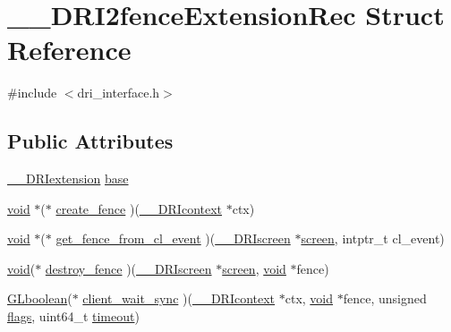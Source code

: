 \hypertarget{struct_____d_r_i2fence_extension_rec}{}\section{\+\_\+\+\_\+\+D\+R\+I2fence\+Extension\+Rec Struct Reference}
\label{struct_____d_r_i2fence_extension_rec}


{\ttfamily \#include $<$dri\+\_\+interface.\+h$>$}

\subsection*{Public Attributes}
\begin{DoxyCompactItemize}
\item 
\hyperlink{dri__interface_8h_a4e0a61c8ece00d2b2c6792a9a1b55385}{\+\_\+\+\_\+\+D\+R\+Iextension} \hyperlink{struct_____d_r_i2fence_extension_rec_a887144d176907da6cc6f255baa6b142c}{base}
\item 
\hyperlink{_s_d_l__opengles2__gl2ext_8h_ae5d8fa23ad07c48bb609509eae494c95}{void} $\ast$($\ast$ \hyperlink{struct_____d_r_i2fence_extension_rec_ad75a0042594520674e333b2105f72e91}{create\+\_\+fence} )(\hyperlink{dri__interface_8h_a3fd295cba82b5a3d79f1ee7e12bfb908}{\+\_\+\+\_\+\+D\+R\+Icontext} $\ast$ctx)
\item 
\hyperlink{_s_d_l__opengles2__gl2ext_8h_ae5d8fa23ad07c48bb609509eae494c95}{void} $\ast$($\ast$ \hyperlink{struct_____d_r_i2fence_extension_rec_aab159b47cdc19dbd3e3e05e1e2a8b783}{get\+\_\+fence\+\_\+from\+\_\+cl\+\_\+event} )(\hyperlink{dri__interface_8h_a9961b01d421ee1fd6ed3c05acc9ca561}{\+\_\+\+\_\+\+D\+R\+Iscreen} $\ast$\hyperlink{cad_8h_ae04e09e4e3831bfc1632c509ae37dcec}{screen}, intptr\+\_\+t cl\+\_\+event)
\item 
\hyperlink{_s_d_l__opengles2__gl2ext_8h_ae5d8fa23ad07c48bb609509eae494c95}{void}($\ast$ \hyperlink{struct_____d_r_i2fence_extension_rec_a482020bd8edb9b4d4851d3ac40336da6}{destroy\+\_\+fence} )(\hyperlink{dri__interface_8h_a9961b01d421ee1fd6ed3c05acc9ca561}{\+\_\+\+\_\+\+D\+R\+Iscreen} $\ast$\hyperlink{cad_8h_ae04e09e4e3831bfc1632c509ae37dcec}{screen}, \hyperlink{_s_d_l__opengles2__gl2ext_8h_ae5d8fa23ad07c48bb609509eae494c95}{void} $\ast$fence)
\item 
\hyperlink{gl_8h_aea1419aa8aec5854bd9807b45171029d}{G\+Lboolean}($\ast$ \hyperlink{struct_____d_r_i2fence_extension_rec_ab8888221e5e53dc147dae85578148cca}{client\+\_\+wait\+\_\+sync} )(\hyperlink{dri__interface_8h_a3fd295cba82b5a3d79f1ee7e12bfb908}{\+\_\+\+\_\+\+D\+R\+Icontext} $\ast$ctx, \hyperlink{_s_d_l__opengles2__gl2ext_8h_ae5d8fa23ad07c48bb609509eae494c95}{void} $\ast$fence, unsigned \hyperlink{glcorearb_8h_ac7ba7d3cce3d19ca020e056b37231289}{flags}, uint64\+\_\+t \hyperlink{glcorearb_8h_ad29bb0d8468b264a4e3d9204366cfaab}{timeout})

\end{DoxyCompactItemize}
